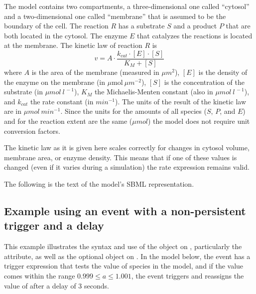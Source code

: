 The model contains two compartments, a three-dimensional one
called {}``cytosol'' and a two-dimensional one called
{}``membrane'' that is assumed to be the boundary of the cell. The
reaction $R$ has a substrate $S$ and a product $P$ that are both
located in the cytosol. The enzyme $E$ that catalyzes the
reactions is located at the membrane. The kinetic law of reaction
$R$ is\[ v=A\cdot\frac{k_{cat}\cdot[E]\cdot[S]}{K_{M}+[S]}\] where
$A$ is the area of the membrane (measured in $\mu m^{2}$), $[E]$
is the density of the enzyme on the membrane (in
$\mu\mathrm{mol}~\mu m^{-2}$), $[S]$ is the concentration of the
substrate (in $\mu mol~l^{\,-1}$), $K_{M}$ the Michaelis-Menten
constant (also in $\mu mol~l^{\,-1}$), and $k_{cat}$ the rate
constant (in $min^{-1}$). The units of the result of the kinetic
law are in $\mu mol~min^{-1}$. Since the units for the amounts of
all species ($S$, $P$, and $E$) and for the reaction extent are
the same ($\mu mol$) the model does not require unit conversion
factors.

The kinetic law as it is given here scales correctly for changes
in cytosol volume, membrane area, or enzyme density. This means
that if one of these values is changed (even if it varies during a
simulation) the rate expression remains valid.

The following is the text of the model's SBML representation.



\begin{blockChanged}

\subsection{Example using an event with a non-persistent trigger and a delay}
\label{sec:eg:nonpersistent-trigger}

This example illustrates the syntax and use of the \Trigger object
on \Event, particularly the  attribute, as well
as the optional \Delay object on \Event.  In the model below, the
event has a trigger expression that tests the value of species
 in the model, and if the value comes within the range
$0.999 \leq a \leq 1.001$, the event triggers and reassigns the
value of  after a delay of 3 seconds.


\end{blockChanged}
